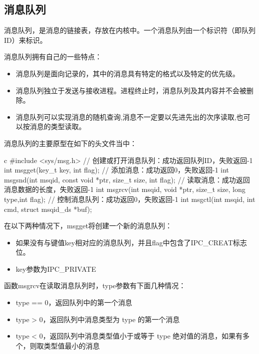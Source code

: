 \subsection{消息队列}
消息队列，是消息的链接表，存放在内核中。一个消息队列由一个标识符（即队列ID）来标识。

消息队列拥有自己的一些特点：
\begin{itemize}
    \item 消息队列是面向记录的，其中的消息具有特定的格式以及特定的优先级。
    \item 消息队列独立于发送与接收进程。进程终止时，消息队列及其内容并不会被删除。
    \item 消息队列可以实现消息的随机查询,消息不一定要以先进先出的次序读取,也可以按消息的类型读取。
\end{itemize}

消息队列的主要原型在如下的头文件当中：
\begin{code-block}{c}
#include <sys/msg.h>
// 创建或打开消息队列：成功返回队列ID，失败返回-1
int msgget(key_t key, int flag);
// 添加消息：成功返回0，失败返回-1
int msgsnd(int msqid, const void *ptr, size_t size, int flag);
// 读取消息：成功返回消息数据的长度，失败返回-1
int msgrcv(int msqid, void *ptr, size_t size, long type,int flag);
// 控制消息队列：成功返回0，失败返回-1
int msgctl(int msqid, int cmd, struct msqid_ds *buf);
\end{code-block}

在以下两种情况下，msgget将创建一个新的消息队列：
\begin{itemize}
    \item 如果没有与键值key相对应的消息队列，并且flag中包含了IPC\_CREAT标志位。
    \item key参数为IPC\_PRIVATE
\end{itemize}

函数msgrcv在读取消息队列时，type参数有下面几种情况：
\begin{itemize}
    \item type == 0，返回队列中的第一个消息
    \item type > 0，返回队列中消息类型为 type 的第一个消息
    \item type < 0，返回队列中消息类型值小于或等于 type 绝对值的消息，如果有多个，则取类型值最小的消息
\end{itemize}


